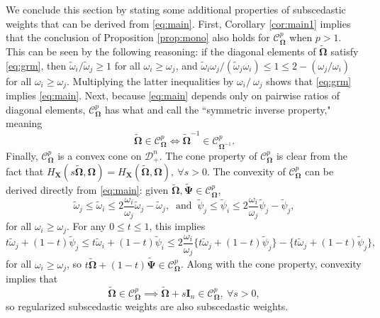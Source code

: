 \documentclass[12pt]{article}
\newcommand{\bl}[1]{{\mathbf #1}}
\newcommand{\bs}[1]{\boldsymbol #1}
\begin{document}
We conclude this section by stating some additional properties of subscedastic weights that can be derived from \eqref{eq:main}. First, Corollary \ref{cor:main1} implies that the conclusion of Proposition \ref{prop:mono} also holds for $\mathcal{C}_{\bs{\Omega}}^p$ when $p>1$. This can be seen by the following reasoning: if the diagonal elements of $\tilde{\bs{\Omega}}$ satisfy \eqref{eq:grm}, then $\tilde{\omega}_i / \tilde{\omega}_j \geq 1$ for all $\omega_i \geq \omega_j$, and $\tilde{\omega}_i \omega_j / (\tilde{\omega}_j \omega_i) \leq 1 \leq 2-(\omega_j / \omega_i)$ for all $\omega_i \geq \omega_j$. Multiplying the latter inequalities by $\omega_i /\ \omega_j$ shows that \eqref{eq:grm} implies \eqref{eq:main}. Next, because \eqref{eq:main} depends only on pairwise ratios of diagonal elements, $\mathcal{C}^p_{\bs{\Omega}}$ has what \cite{bilodeau_choice_1990} and \cite{kariya_generalized_2004} call the ``symmetric inverse property," meaning
\begin{equation*}
	\tilde{\bs{\Omega}} \in \mathcal{C}^p_{\bs{\Omega}} \iff \tilde{\bs{\Omega}}^{-1} \in \mathcal{C}^p_{\bs{\Omega}^{-1}}.
\end{equation*}
Finally, $\mathcal{C}_{\bs{\Omega}}^p$ is a convex cone on $\mathcal{D}_+^n$. The cone property of $\mathcal{C}^p_{\bs{\Omega}}$ is clear from the fact that $H_{\bl{X}}(s\tilde{\bs{\Omega}}, \bs{\Omega}) = H_{\bl{X}}(\tilde{\bs{\Omega}}, \bs{\Omega}),~\forall s>0$. The convexity of $\mathcal{C}^p_{\bs{\Omega}}$ can be derived directly from \eqref{eq:main}: given $\tilde{\bs{\Omega}}, \tilde{\bs{\Psi}} \in \mathcal{C}^p_{\bs{\Omega}}$,
\begin{equation*}
    \tilde{\omega}_j \leq \tilde{\omega}_i \leq 2\frac{\omega_i}{\omega_j} \tilde{\omega}_j - \tilde{\omega}_j,~\text{ and }~\tilde{\psi}_j \leq \tilde{\psi}_i \leq 2\frac{\omega_i}{\omega_j} \tilde{\psi}_j - \tilde{\psi}_j,
\end{equation*}
for all $\omega_i \geq \omega_j$. For any $0 \leq t \leq 1$, this implies
\begin{equation*}
    t \tilde{\omega}_j + (1-t)\tilde{\psi}_j \leq t \tilde{\omega}_i + (1-t)\tilde{\psi}_i \leq 2\frac{\omega_i}{\omega_j} \{t \tilde{\omega}_j + (1-t)\tilde{\psi}_j\} - \{t \tilde{\omega}_j + (1-t)\tilde{\psi}_j\},
\end{equation*}
for all $\omega_i \geq \omega_j$, so $t \tilde{\bs{\Omega}} + (1-t) \tilde{\bs{\Psi}} \in \mathcal{C}^p_{\bs{\Omega}}$. Along with the cone property, convexity implies that 
\begin{equation}\label{eq:reg}
\tilde{\bs{\Omega}} \in \mathcal{C}^p_{\bs{\Omega}} \implies \tilde{\bs{\Omega}} + s\bl{I}_n \in \mathcal{C}^p_{\bs{\Omega}},~\forall s>0,
\end{equation}
so regularized subscedastic weights are also subscedastic weights.
\end{document}
